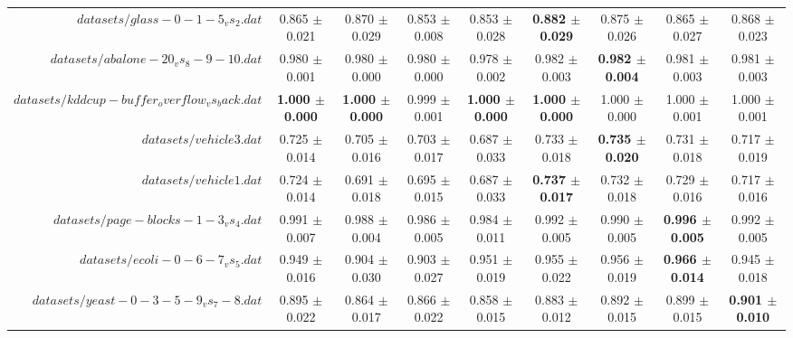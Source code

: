\begin{table}[!ht]
{\begin{tabular}{r c c c c c c c c}
$datasets/glass-0-1-5_vs_2.dat$ & 0.865 $\pm$ 0.021 & 0.870 $\pm$ 0.029 & 0.853 $\pm$ 0.008 & 0.853 $\pm$ 0.028 & \textbf{0.882 $\pm$ 0.029} & 0.875 $\pm$ 0.026 & 0.865 $\pm$ 0.027 & 0.868 $\pm$ 0.023 \\
$datasets/abalone-20_vs_8-9-10.dat$ & 0.980 $\pm$ 0.001 & 0.980 $\pm$ 0.000 & 0.980 $\pm$ 0.000 & 0.978 $\pm$ 0.002 & 0.982 $\pm$ 0.003 & \textbf{0.982 $\pm$ 0.004} & 0.981 $\pm$ 0.003 & 0.981 $\pm$ 0.003 \\
$datasets/kddcup-buffer_overflow_vs_back.dat$ & \textbf{1.000 $\pm$ 0.000} & \textbf{1.000 $\pm$ 0.000} & 0.999 $\pm$ 0.001 & \textbf{1.000 $\pm$ 0.000} & \textbf{1.000 $\pm$ 0.000} & 1.000 $\pm$ 0.000 & 1.000 $\pm$ 0.001 & 1.000 $\pm$ 0.001 \\
$datasets/vehicle3.dat$ & 0.725 $\pm$ 0.014 & 0.705 $\pm$ 0.016 & 0.703 $\pm$ 0.017 & 0.687 $\pm$ 0.033 & 0.733 $\pm$ 0.018 & \textbf{0.735 $\pm$ 0.020} & 0.731 $\pm$ 0.018 & 0.717 $\pm$ 0.019 \\
$datasets/vehicle1.dat$ & 0.724 $\pm$ 0.014 & 0.691 $\pm$ 0.018 & 0.695 $\pm$ 0.015 & 0.687 $\pm$ 0.033 & \textbf{0.737 $\pm$ 0.017} & 0.732 $\pm$ 0.018 & 0.729 $\pm$ 0.016 & 0.717 $\pm$ 0.016 \\
$datasets/page-blocks-1-3_vs_4.dat$ & 0.991 $\pm$ 0.007 & 0.988 $\pm$ 0.004 & 0.986 $\pm$ 0.005 & 0.984 $\pm$ 0.011 & 0.992 $\pm$ 0.005 & 0.990 $\pm$ 0.005 & \textbf{0.996 $\pm$ 0.005} & 0.992 $\pm$ 0.005 \\
$datasets/ecoli-0-6-7_vs_5.dat$ & 0.949 $\pm$ 0.016 & 0.904 $\pm$ 0.030 & 0.903 $\pm$ 0.027 & 0.951 $\pm$ 0.019 & 0.955 $\pm$ 0.022 & 0.956 $\pm$ 0.019 & \textbf{0.966 $\pm$ 0.014} & 0.945 $\pm$ 0.018 \\
$datasets/yeast-0-3-5-9_vs_7-8.dat$ & 0.895 $\pm$ 0.022 & 0.864 $\pm$ 0.017 & 0.866 $\pm$ 0.022 & 0.858 $\pm$ 0.015 & 0.883 $\pm$ 0.012 & 0.892 $\pm$ 0.015 & 0.899 $\pm$ 0.015 & \textbf{0.901 $\pm$ 0.010} \\
\end{tabular}}
\end{table}
